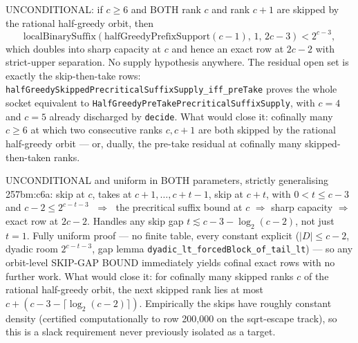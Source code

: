\begin{thm}
UNCONDITIONAL: if $c\ge6$ and BOTH rank $c$ and rank $c+1$ are skipped by the rational
half-greedy orbit, then
\[
\mathrm{localBinarySuffix}(\mathrm{halfGreedyPrefixSupport}(c-1),\,1,\,2c-3) < 2^{c-3},
\]
which doubles into sharp capacity at $c$ and hence an exact row at $2c-2$ with strict-upper
separation. No supply hypothesis anywhere. The residual open set is exactly the
skip-then-take rows: \texttt{halfGreedySkippedPrecriticalSuffixSupply\_iff\_preTake} proves the
whole socket equivalent to \texttt{HalfGreedyPreTakePrecriticalSuffixSupply}, with $c=4$ and
$c=5$ already discharged by \texttt{decide}. What would close it: cofinally many $c\ge6$ at
which two consecutive ranks $c,c+1$ are both skipped by the rational half-greedy orbit — or,
dually, the pre-take residual at cofinally many skipped-then-taken ranks.
\par\noindent{}     
\end{thm}

\begin{thm}
UNCONDITIONAL and uniform in BOTH parameters, strictly generalising 257bm:c6a: skip at $c$,
takes at $c+1,\dots,c+t-1$, skip at $c+t$, with $0<t\le c-3$ and $c-2\le2^{c-t-3}$
$\;\Longrightarrow\;$ the precritical suffix bound at $c$ $\Rightarrow$ sharp capacity
$\Rightarrow$ exact row at $2c-2$. Handles any skip gap $t\lesssim c-3-\log_2(c-2)$, not just
$t=1$. Fully uniform proof — no finite table, every constant explicit
($|D|\le c-2$, dyadic room $2^{c-t-3}$, gap lemma
\texttt{dyadic\_lt\_forcedBlock\_of\_tail\_lt}) — so any orbit-level SKIP-GAP BOUND immediately
yields cofinal exact rows with no further work. What would close it: for cofinally many
skipped ranks $c$ of the rational half-greedy orbit, the next skipped rank lies at most
$c+(c-3-\lceil\log_2(c-2)\rceil)$. Empirically the skips have roughly constant density
(certified computationally to row 200{,}000 on the sqrt-escape track), so this is a slack
requirement never previously isolated as a target.
\par\noindent{}     
\end{thm}

